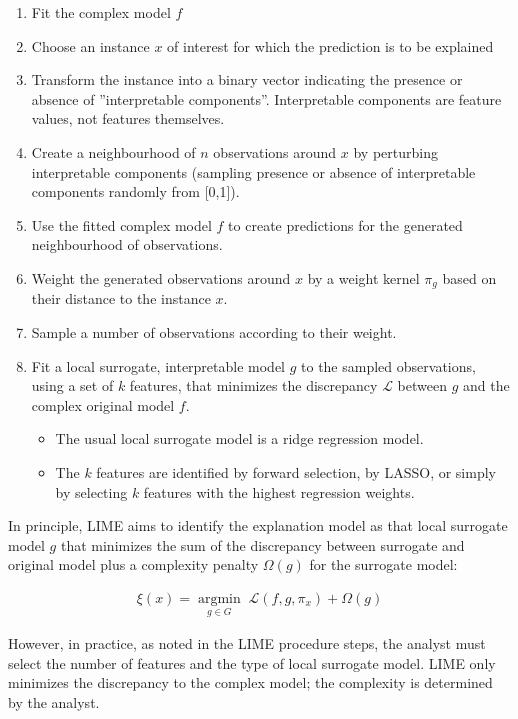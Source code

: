 \begin{enumerate}
\item Fit the complex model $f$
\item Choose an instance $x$ of interest for which the prediction is to be explained
\item Transform the instance into a binary vector indicating the presence or absence of ''interpretable components''. Interpretable components are feature values, not features themselves.
\item Create a neighbourhood of $n$ observations around $x$ by perturbing interpretable components (sampling presence or absence of interpretable components randomly from [0,1]).
\item Use the fitted complex model $f$ to create predictions for the generated neighbourhood of observations.
\item Weight the generated observations around $x$ by a weight kernel $\pi_g$ based on their distance to the instance $x$.
\item Sample a number of observations according to their weight.
\item Fit a local surrogate, interpretable model $g$ to the sampled observations, using a set of $k$ features, that minimizes the discrepancy $\mathcal{L}$ between $g$ and the complex original model $f$.
\begin{itemize}
   \item The usual local surrogate model is a ridge regression model.
   \item The $k$ features are identified by forward selection, by LASSO, or simply by selecting $k$ features with the highest regression weights.
\end{itemize}
\end{enumerate}

In principle, LIME aims to identify the explanation model as that local surrogate model $g$ that minimizes the sum of the discrepancy between surrogate and original model plus a complexity penalty $\Omega(g)$ for the surrogate model:

\begin{align*}
\xi(x) = \operatorname*{argmin}_{g \in G} \; \mathcal{L} (f, g, \pi_x) + \Omega(g)
\end{align*}

However, in practice, as noted in the LIME procedure steps, the analyst must select the number of features and the type of local surrogate model. LIME only minimizes the discrepancy to the complex model; the complexity is determined by the analyst.


